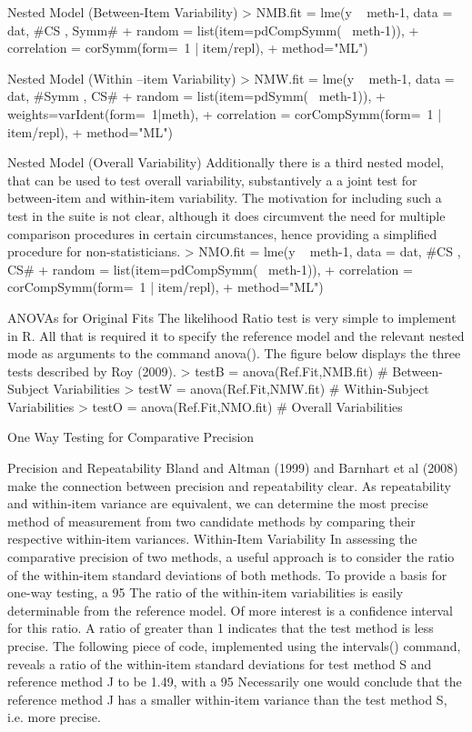 Nested Model (Between-Item Variability)
> NMB.fit  = lme(y ~ meth-1, data = dat,   #CS , Symm#
+     random = list(item=pdCompSymm(~ meth-1)),
+     correlation = corSymm(form=~1 | item/repl), 
+     method="ML")


Nested Model (Within –item Variability)
> NMW.fit = lme(y ~ meth-1, data = dat,   #Symm , CS# 
+     random = list(item=pdSymm(~ meth-1)),
+     weights=varIdent(form=~1|meth), 
+     correlation = corCompSymm(form=~1 | item/repl), 
+     method="ML")


Nested Model (Overall Variability)
Additionally there is a third nested model, that can be used to test overall variability, substantively a a joint test for between-item and within-item variability. The motivation for including such a test in the suite is not clear, although it does circumvent the need for multiple comparison procedures in certain circumstances, hence providing a simplified procedure for non-statisticians.
> NMO.fit = lme(y ~ meth-1, data = dat,   #CS , CS# 
+     random = list(item=pdCompSymm(~ meth-1)), 
+     correlation = corCompSymm(form=~1 | item/repl), 
+     method="ML")


ANOVAs  for  Original Fits
The likelihood Ratio test is very simple to implement in R. All that is required it to specify the reference model and the relevant nested mode as arguments to the command anova().
The figure below displays the three tests described by Roy (2009).
> testB    = anova(Ref.Fit,NMB.fit)                          # Between-Subject Variabilities
> testW   = anova(Ref.Fit,NMW.fit)                        # Within-Subject Variabilities
> testO     = anova(Ref.Fit,NMO.fit)                        # Overall Variabilities



One Way Testing for Comparative Precision

Precision and Repeatability
Bland and Altman (1999) and Barnhart et al (2008) make the connection between precision and repeatability clear. As repeatability and within-item variance are equivalent, we can determine the most precise method of measurement from two candidate methods by comparing their respective within-item variances.
Within-Item Variability
In assessing the comparative precision of two methods, a useful approach is to consider the ratio of the within-item standard deviations of both methods.
To provide a basis for one-way testing, a 95%
The ratio of the within-item variabilities is easily determinable from the reference model. Of more interest is a confidence interval for this ratio. A ratio of greater than 1 indicates that the test method is less precise.
The following piece of code, implemented using the intervals() command,  reveals a ratio of the within-item standard deviations for test method S and reference method J to be 1.49, with a 95%
Necessarily one would conclude that the reference method J has a smaller within-item variance than the test method S, i.e. more precise.

